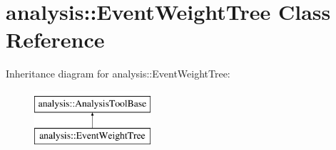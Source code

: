\hypertarget{classanalysis_1_1EventWeightTree}{}\section{analysis\+:\+:Event\+Weight\+Tree Class Reference}
\label{classanalysis_1_1EventWeightTree}
Inheritance diagram for analysis\+:\+:Event\+Weight\+Tree\+:\begin{figure}[H]
\begin{center}
\leavevmode
\includegraphics[height=2.000000cm]{classanalysis_1_1EventWeightTree}
\end{center}
\end{figure}
